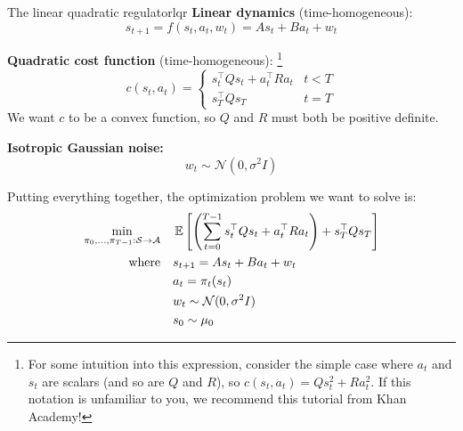 \documentclass[../main/main]{subfiles}
\begin{document}


\begin{definition}{The linear quadratic regulator}{lqr}
    \textbf{Linear dynamics} (time-homogeneous): \[
        s_{t+1} = f(s_t, a_t, w_t) = A s_t + B a_t + w_t
    \]

    \noindent \textbf{Quadratic cost function} (time-homogeneous):
    \footnote{For some intuition into this expression, consider the simple case where $a_t$ and $s_t$ are scalars (and so are $Q$ and $R$), so $c(s_t, a_t) = Q s_t^2 + R a_t^2$. If this notation is unfamiliar to you, we recommend this tutorial from Khan Academy!}
    \[
        c(s_t, a_t) = \begin{cases}
            s_t^\top Q s_t + a_t^\top R a_t & t < T \\
            s_T^\top Q s_T & t = T
        \end{cases}
    \]
    We want $c$ to be a convex function, so $Q$ and $R$ must both be positive definite.

    \noindent \textbf{Isotropic Gaussian noise:} \[ w_t \sim \mathcal{N}(0, \sigma^2 I) \]

    \noindent Putting everything together, the optimization problem we want to solve is:
    \begin{align*}
        \min_{\pi_0, \dots, \pi_{T-1} : \mathcal{S} \to \mathcal{A}} \quad & \operatorname*{\mathbb{E}} \left[ \left( \sum_{t=0}^{T-1} s_t^\top Q s_t + a_t^\top R a_t \right) + s_T^\top Q s_T \right] \\
        \textrm{where} \quad & s_{t+1} = A s_t + B a_t + w_t \\
        & a_t = \pi_t (s_t) \\
        & w_t \sim \mathcal{N}(0, \sigma^2 I) \\
        & s_0 \sim \mu_0
    \end{align*}
\end{definition}
\end{document}

